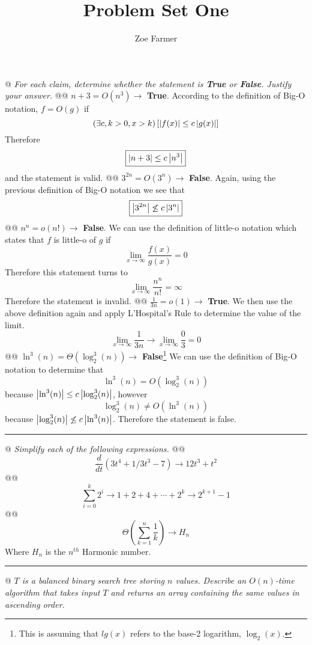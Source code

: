 \documentclass[10pt]{article}
\title{Problem Set One}
\author{Zoe Farmer}
\begin{document}
\maketitle

\begin{easylist}[enumerate]
    @ \textit{For each claim, determine whether the statement is \textbf{True} or \textbf{False}. Justify your answer.}
    @@ $ n + 3 = O(n^3) \to $ \textbf{True}. According to the definition of Big-O notation, $f = O(g)$ if
        \[ \left( \exists c, k > 0, x > k \right) \left[ \left\lvert f(x) \right\rvert \le c \left\lvert g(x) \right\rvert \right] \]
        Therefore
        \[ \boxed{\left\lvert n+3 \right\rvert \le c \left\lvert n^3 \right\rvert } \]
        and the statement is valid.
    @@ $ 3^{2n} = O(3^n) \to $ \textbf{False}. Again, using the previous definition of Big-O notation we see that
        \[ \boxed{\left\lvert 3^{2n}  \right\rvert \not\le c \left\lvert 3^n \right\rvert } \]
    @@ $ n^n = o(n!) \to $ \textbf{False}. We can use the definition of little-o notation which states that $f$ is little-o of $g$ if
        \[ \lim_{x\to\infty} \frac{f(x)}{g(x)} = 0 \]
        Therefore this statement turns to
        \[ \boxed{\lim_{x\to\infty} \frac{n^n}{n!} = \infty} \]
        Therefore the statement is invalid.
    @@ $ \frac{1}{3n} = o(1) \to $ \textbf{True}. We then use the above definition again and apply L'Hospital's Rule to determine the value of the limit.
        \[ \lim_{x\to\infty} \frac{1}{3n} \to \boxed{\lim_{x\to\infty} \frac{0}{3} = 0} \]
    @@ $ \ln^3(n) = \Theta (\log^3_2(n)) \to $ \textbf{False}\footnote{This is assuming that $lg(x)$ refers to the base-2 logarithm, $\log_2(x)$.} We can use the definition of Big-O notation to determine that
        \[ \boxed{\ln^3(n) = O(\log^3_2(n))} \]
        because $\left\lvert \ln^3(n) \right\rvert \le c \left\lvert \log^3_2(n) \right\rvert$, however
        \[ \boxed{\log^3_2(n) \neq O(\ln^3(n))} \]
        because $\left\lvert \log^3_2(n) \right\rvert \not\le c \left\lvert \ln^3(n) \right\rvert$. Therefore the statement is false.

    \rule{3in}{0.5pt}

    @ \textit{Simplify each of the following expressions.}
    @@ \[ \frac{d}{dt} (3t^4 + 1/3 t^3 - 7 ) \to \boxed{12t^3 + t^2} \]
    @@ \[ \sum^k_{i=0} 2^i \to 1 + 2 + 4 + \cdots + 2^k \to \boxed{2^{k+1} - 1} \]
    @@ \[ \Theta \left( \sum^n_{k=1} \frac{1}{k} \right) \to \boxed{H_n} \] Where $H_n$ is the $n^{th}$ Harmonic number.

    \rule{3in}{0.5pt}

    @ \textit{$T$ is a balanced binary search tree storing $n$ values. Describe an $O(n)$-time algorithm that takes input $T$ and returns an array containing the same values in \textit{ascending} order.}


\end{easylist}
\end{document}
